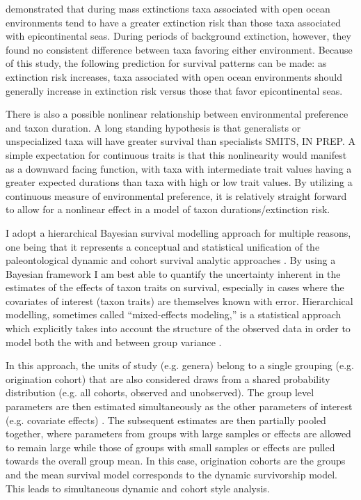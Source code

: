 \documentclass[12pt,letterpaper]{article}
\begin{document}
\citet{Miller2009a} demonstrated that during mass extinctions taxa associated with open ocean environments tend to have a greater extinction risk than those taxa associated with epicontinental seas. During periods of background extinction, however, they found no consistent difference between taxa favoring either environment. Because of this study, the following prediction for survival patterns can be made: as extinction risk increases, taxa associated with open ocean environments should generally increase in extinction risk versus those that favor epicontinental seas.

There is also a possible nonlinear relationship between environmental preference and taxon duration. A long standing hypothesis is that generalists or unspecialized taxa will have greater survival than specialists \citep{Simpson1944,Liow2004a,Liow2007b,Nurnberg2013a,Nurnberg2015,Baumiller1993} \uppercase{Smits, in prep}. A simple expectation for continuous traits is that this nonlinearity would manifest as a downward facing function, with taxa with intermediate trait values having a greater expected durations than taxa with high or low trait values. By utilizing a continuous measure of environmental preference, it is relatively straight forward to allow for a nonlinear effect in a model of taxon durations/extinction risk.

I adopt a hierarchical Bayesian survival modelling approach for multiple reasons, one being that it represents a conceptual and statistical unification of the paleontological dynamic and cohort survival analytic approaches \citep{VanValen1973,VanValen1979,Raup1978,Raup1975,Foote1988,Baumiller1993,Simpson2006}. By using a Bayesian framework I am best able to quantify the uncertainty inherent in the estimates of the effects of taxon traits on survival, especially in cases where the covariates of interest (taxon traits) are themselves known with error. Hierarchical modelling, sometimes called ``mixed-effects modeling,'' is a statistical approach which explicitly takes into account the structure of the observed data in order to model both the with and between group variance \citep{Gelman2013d,Gelman2007}.

In this approach, the units of study (e.g. genera) belong to a single grouping (e.g. origination cohort) that are also considered draws from a shared probability distribution (e.g. all cohorts, observed and unobserved). The group level parameters are then estimated simultaneously as the other parameters of interest (e.g. covariate effects) \citep{Gelman2013d}. The subsequent estimates are then partially pooled together, where parameters from groups with large samples or effects are allowed to remain large while those of groups with small samples or effects are pulled towards the overall group mean. In this case, origination cohorts are the groups and the mean survival model corresponds to the dynamic survivorship model. This leads to simultaneous dynamic and cohort style analysis.
\end{document}
